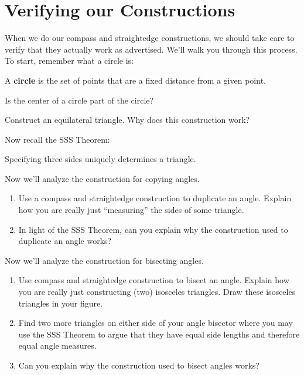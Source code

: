\newpage
\section{Verifying our Constructions}


When we do our compass and straightedge constructions, we should take
care to verify that they actually work as advertised. We'll walk you
through this process. To start, remember what a circle is:

\begin{definition} 
A \textbf{circle} is the set of points that are a fixed distance from
a given point.
\end{definition}

\begin{prob} Is the center of a circle part of the circle?
\end{prob}

\begin{prob} 
Construct an equilateral triangle.  Why does this construction work?
\end{prob}




Now recall the SSS Theorem:

\begin{theorem}[SSS] 
Specifying three sides uniquely determines a triangle.
\end{theorem}



\begin{prob} Now we'll analyze the construction for copying angles. 
\begin{enumerate}
\item Use a compass and straightedge construction to duplicate an
  angle. Explain how you are really just ``measuring'' the sides of
  some triangle.
\item In light of the SSS Theorem, can you explain why the
  construction used to duplicate an angle works?
\end{enumerate}
\end{prob}


\begin{prob} Now we'll analyze the construction for bisecting angles.
\begin{enumerate}
\item Use compass and straightedge construction to bisect an
  angle. Explain how you are really just constructing (two)
  isosceles triangles. Draw these isosceles triangles in your figure.
\item Find two more triangles on either side of your angle bisector where
  you may use the SSS Theorem to argue that they have equal side
  lengths and therefore equal angle measures.
\item Can you explain why the construction used to bisect angles
  works?
\end{enumerate}
\end{prob}


